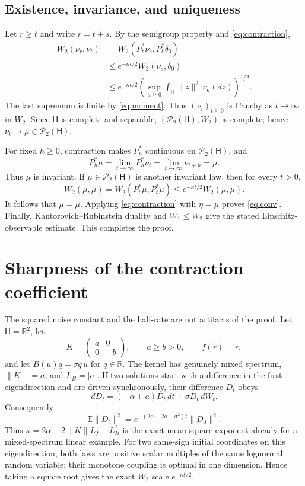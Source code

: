 \documentclass[11pt]{article}
\newcommand{\HH}{\mathsf H}
\newcommand{\PP}{\mathcal P_2}
\newcommand{\Wtwo}{W_2}
\begin{document}
\subsection{Existence, invariance, and uniqueness}

Let \(r\ge t\) and write \(r=t+s\).  By the semigroup property and
\eqref{eq:contraction},
\begin{align*}
 \Wtwo(\nu_r,\nu_t)
 &=\Wtwo(P_t^*\nu_s,P_t^*\delta_0)\\
 &\le e^{-\kappa t/2}\Wtwo(\nu_s,\delta_0)\\
 &\le e^{-\kappa t/2}
 \left(\sup_{a\ge0}\int_{\HH}\lVert z\rVert^2\,\nu_a(dz)\right)^{1/2}.
\end{align*}
The last supremum is finite by \eqref{eq:moment}.  Thus \((\nu_t)_{t\ge0}\)
is Cauchy as \(t\to\infty\) in \(\Wtwo\).  Since \(\HH\) is complete and
separable, \((\PP(\HH),\Wtwo)\) is complete\cite{Villani}; hence
\(\nu_t\to\mu\in\PP(\HH)\).

For fixed \(h\ge0\), contraction makes \(P_h^*\) continuous on
\(\PP(\HH)\), and
\[
 P_h^*\mu=\lim_{t\to\infty}P_h^*\nu_t
 =\lim_{t\to\infty}\nu_{t+h}=\mu.
\]
Thus \(\mu\) is invariant.  If \(\widetilde\mu\in\PP(\HH)\) is another
invariant law, then for every \(t>0\),
\[
 \Wtwo(\mu,\widetilde\mu)
 =\Wtwo(P_t^*\mu,P_t^*\widetilde\mu)
 \le e^{-\kappa t/2}\Wtwo(\mu,\widetilde\mu).
\]
It follows that \(\mu=\widetilde\mu\).  Applying
\eqref{eq:contraction} with \(\eta=\mu\) proves \eqref{eq:conv}.
Finally, Kantorovich--Rubinstein duality and \(W_1\le W_2\) give the stated
Lipschitz-observable estimate.  This completes the proof.

\section{Sharpness of the contraction coefficient}

The squared noise constant and the half-rate are not artifacts of the proof.
Let \(\HH=\mathbb R^2\), let
\[
 K=\begin{pmatrix}a&0\\0&-b\end{pmatrix},
 \qquad a\ge b>0,\qquad f(r)=r,
\]
and let \(B(u)q=\sigma q\,u\) for \(q\in\mathbb R\).  The kernel has genuinely
mixed spectrum, \(\lVert K\rVert=a\), and \(L_B=|\sigma|\).  If two solutions
start with a difference in the first eigendirection and are driven
synchronously, their difference \(D_t\) obeys
\[
 dD_t=(-\alpha+a)D_t\,dt+\sigma D_t\,dW_t.
\]
Consequently
\[
 \mathbb E\lVert D_t\rVert^2
 =e^{-(2\alpha-2a-\sigma^2)t}\lVert D_0\rVert^2.
\]
Thus \(\kappa=2\alpha-2\lVert K\rVert L_f-L_B^2\) is the exact
mean-square exponent already for a mixed-spectrum linear example.  For two
same-sign initial coordinates on this eigendirection, both laws are positive
scalar multiples of the same lognormal random variable; their monotone
coupling is optimal in one dimension.  Hence taking a square root gives the
exact \(W_2\) scale \(e^{-\kappa t/2}\).
\end{document}
